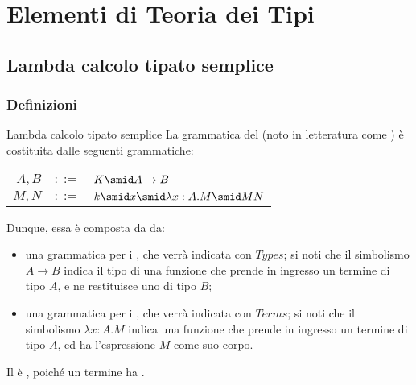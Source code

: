 \documentclass[a4paper, 12pt]{report}
\begin{document}
    \chapter{Elementi di Teoria dei Tipi}

    \section{Lambda calcolo tipato semplice}

    \subsection{Definizioni}

    \begin{frameddefn}{Lambda calcolo tipato semplice}
        La grammatica del  (noto in letteratura come ) è costituita dalle seguenti grammatiche:

        \begin{center}
            \begin{tabular}{rcl}
                $A, B$ & $::=$ & $K \smid A \to B$ \\
                $M, N$ & $::=$ & $k \smid x \smid \lambda x:A.M \smid MN$ \\
            \end{tabular}
        \end{center}

        Dunque, essa è composta da da:

        \begin{itemize}
            \item una grammatica per i , che verrà indicata con $Types$; si noti che il simbolismo $A \to B$ indica il tipo di una funzione che prende in ingresso un termine di tipo $A$, e ne restituisce uno di tipo $B$;
            \item una grammatica per i , che verrà indicata con $Terms$; si noti che il simbolismo $\lambda x: A.M$ indica una funzione che prende in ingresso un termine di tipo $A$, ed ha l'espressione $M$ come suo corpo.
        \end{itemize}

        Il  è , poiché un termine ha .
    \end{frameddefn}
\end{document}
